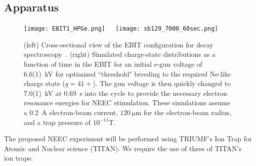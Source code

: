 \documentclass[12pt]{article}
\begin{document}
\subsection{Apparatus\label{apparatus}}
\begin{figure}[t!]
  \centering
  \texttt{[image: EBIT1\_HPGe.png]}~~~\texttt{[image: sb129\_7000\_60sec.png]}
  \caption{\label{TITAN}\small (left) Cross-sectional view of the EBIT configuration for decay spectroscopy~\cite{Lea15}.  (right) Simulated charge-state distributions as a function of time in the EBIT for an initial e-gun voltage of 6.6(1)~kV for optimized ``threshold" breeding to the required Ne-like charge state ($q=41+$).  The gun voltage is then quickly changed to 7.0(1)~kV at 0.69~s into the cycle to provide the necessary electron resonance energies for NEEC stimulation.  These simulations assume a 0.2~A electron-beam current, $120~\mathrm{\mu m}$ for the electron-beam radius, and a trap pressure of $10^{-11}\mathrm{T}$.}
\end{figure}
The proposed NEEC experiment will be performed using TRIUMF's Ion Trap for Atomic and Nuclear science (TITAN).  We require the use of three of TITAN's ion traps:
\end{document}
